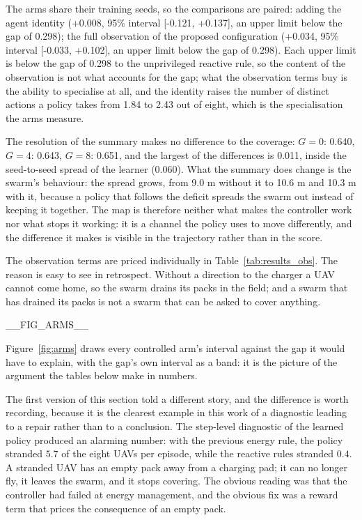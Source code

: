 The arms share their training seeds, so the comparisons are paired: adding the agent identity (+0.008, 95\% interval [-0.121, +0.137], an upper limit below the gap of 0.298); the full observation of the proposed configuration (+0.034, 95\% interval [-0.033, +0.102], an upper limit below the gap of 0.298).  Each upper limit is below the gap of 0.298 to the unprivileged reactive rule, so the content of the observation is not what accounts for the gap; what the observation terms buy is the ability to specialise at all, and the identity raises the number of distinct actions a policy takes from 1.84 to 2.43 out of eight, which is the specialisation the arms measure.

The resolution of the summary makes no difference to the coverage: $G=0$: 0.640, $G=4$: 0.643, $G=8$: 0.651, and the largest of the differences is 0.011, inside the seed-to-seed spread of the learner (0.060).  What the summary does change is the swarm's behaviour: the spread grows, from 9.0 m without it to 10.6 m and 10.3 m with it, because a policy that follows the deficit spreads the swarm out instead of keeping it together.  The map is therefore neither what makes the controller work nor what stops it working: it is a channel the policy uses to move differently, and the difference it makes is visible in the trajectory rather than in the score.

The observation terms are priced individually in Table~\ref{tab:results_obs}.  The reason is easy to see in
retrospect.  Without a direction to the charger a UAV cannot come home, so
the swarm drains its packs in the field; and a swarm that has drained its
packs is not a swarm that can be asked to cover anything.


__FIG_ARMS__

Figure~\ref{fig:arms} draws every controlled arm's interval against the gap it would have to explain, with the gap's own interval as a band: it is the picture of the argument the tables below make in numbers.

The first version of this section told a different story, and the
difference is worth recording, because it is the clearest example in this
work of a diagnostic leading to a repair rather than to a conclusion.  The
step-level diagnostic of the learned policy produced an alarming number:
with the previous energy rule, the policy stranded $5.7$ of the
eight UAVs per episode, while the reactive rules stranded $0.4$.  A
stranded UAV has an empty pack away from a charging pad; it can no longer
fly, it leaves the swarm, and it stops covering.  The obvious reading was
that the controller had failed at energy management, and the obvious fix
was a reward term that prices the consequence of an empty pack.

